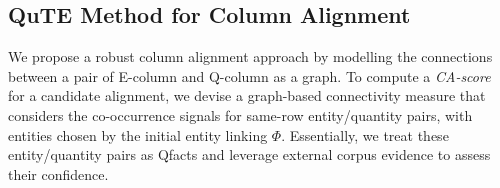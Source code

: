 \begin{comment}
\vspace{0.1cm}
\noindent{\bf Definition [Type Agreement].}
Given two entities $e_i$ and $e_j$, their agreement is computed from their
most specific common type $t$ as follows:
\[
\textit{agree}(e_i, e_j) = \max\big(\textit{itp}(t)\ |\ t \in \textit{types}(e_i) \cap \textit{types}(e_j)\big)
\]
\noindent where $\textit{types}(e_i)$ is the set of all types for $e_i$ obtained from the KB 
(using YAGO, {\small\tt yago-knowledge.org}, as it has an expressive type system) 
and $\textit{itp(t)}$ (\textit{inverse type population}) denotes the specificity of $t$, 
defined as:
$$\textit{itp}(t) = \log_{10}\bigg(\frac{\#\textit{total\_kb\_entities - \#\textit{entities\_with\_type\_t} ~+~ 0.5}}{\#\textit{entities\_with\_type\_t} ~+~ 0.5}\bigg)$$

\noindent \textit{itp} is analogous to \textit{inverse document frequency (idf)}. Types with a low number of entities in the KB are most informative.
%
%
We treat
the type agreement between a pair of same-column cells
as another factor that is included into 
the collective inference.

\end{comment}


\subsection{QuTE Method for Column Alignment}
\label{subsec:CAscore}

We propose a robust column alignment approach by modelling the 
connections between a pair of E-column and Q-column as a graph. 
To compute a \textit{CA-score} for a candidate alignment, we devise a graph-based connectivity measure 
that considers the co-occurrence signals for same-row entity/quantity pairs,
with entities chosen by the initial entity linking $\Phi$.
Essentially, we treat these entity/quantity pairs as Qfacts and
leverage external corpus evidence to assess their
confidence.

